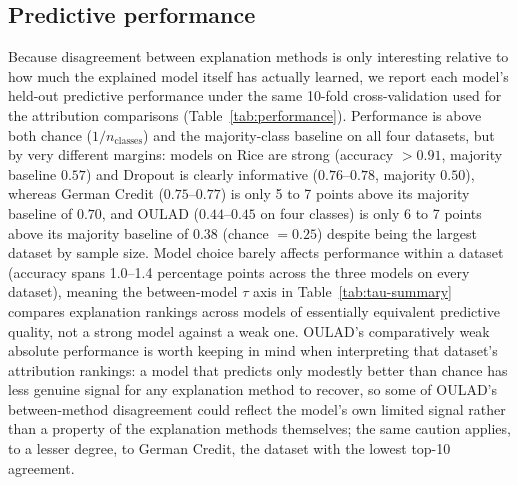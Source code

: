 \documentclass[11pt,twoside,a4paper]{article}
\begin{document}
\subsection{Predictive performance}
Because disagreement between explanation methods is only interesting relative to how much the explained model itself has actually learned, we report each model's held-out predictive performance under the same 10-fold cross-validation used for the attribution comparisons (Table~\ref{tab:performance}). Performance is above both chance ($1/n_{\text{classes}}$) and the majority-class baseline on all four datasets, but by very different margins: models on Rice are strong (accuracy $>0.91$, majority baseline $0.57$) and Dropout is clearly informative ($0.76$--$0.78$, majority $0.50$), whereas German Credit ($0.75$--$0.77$) is only 5 to 7 points above its majority baseline of $0.70$, and OULAD ($0.44$--$0.45$ on four classes) is only 6 to 7 points above its majority baseline of $0.38$ (chance $=0.25$) despite being the largest dataset by sample size. Model choice barely affects performance within a dataset (accuracy spans 1.0--1.4 percentage points across the three models on every dataset), meaning the between-model $\tau$ axis in Table~\ref{tab:tau-summary} compares explanation rankings across models of essentially equivalent predictive quality, not a strong model against a weak one. OULAD's comparatively weak absolute performance is worth keeping in mind when interpreting that dataset's attribution rankings: a model that predicts only modestly better than chance has less genuine signal for any explanation method to recover, so some of OULAD's between-method disagreement could reflect the model's own limited signal rather than a property of the explanation methods themselves; the same caution applies, to a lesser degree, to German Credit, the dataset with the lowest top-10 agreement.
\end{document}
